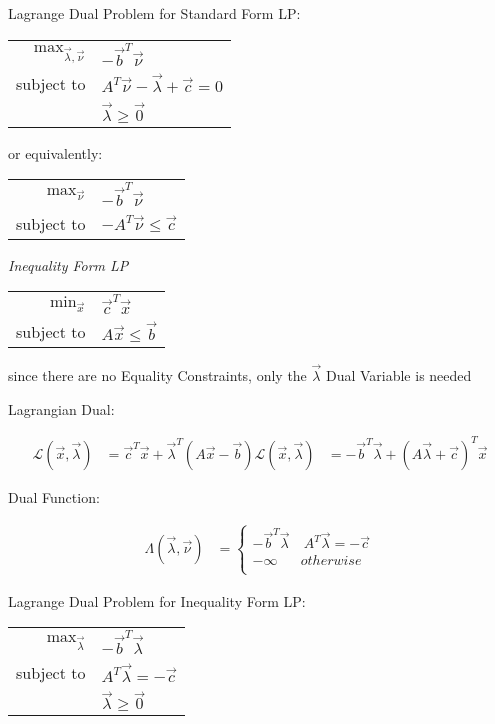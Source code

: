 Lagrange Dual Problem for Standard Form LP:

\begin{tabular}{r l}
  $\mathrm{max}_{\vec{\lambda},\vec{\nu}}$ &
    $-\vec{b}^T\vec{\nu}$ \\
  subject to & $A^T\vec{\nu} - \vec{\lambda} + \vec{c} = 0$ \\
             & $\vec{\lambda} \geq \vec{0}$ \\
\end{tabular}

or equivalently:

\begin{tabular}{r l}
  $\mathrm{max}_{\vec{\nu}}$ &
    $-\vec{b}^T\vec{\nu}$ \\
  subject to & $-A^T\vec{\nu} \leq \vec{c}$ \\
\end{tabular}


\emph{Inequality Form LP}

\begin{tabular}{r l}
  $\mathrm{min}_{\vec{x}}$ & $\vec{c}^T\vec{x}$      \\
  subject to               & $A\vec{x} \leq \vec{b}$ \\
\end{tabular}

since there are no Equality Constraints, only the $\vec{\lambda}$ Dual Variable
is needed

Lagrangian Dual:

\begin{align*}
  \mathcal{L}(\vec{x}, \vec{\lambda}) & =
    \vec{c}^T\vec{x} + \vec{\lambda}^T(A\vec{x} - \vec{b})
  \mathcal{L}(\vec{x}, \vec{\lambda}) & =
    -\vec{b}^T\vec{\lambda} + (A\vec{\lambda} + \vec{c})^T \vec{x}
\end{align*}

Dual Function:

\begin{align*}
  \Lambda(\vec{\lambda},\vec{\nu}) & = \begin{cases}
    -\vec{b}^T\vec{\lambda} & \ A^T\vec{\lambda} = -\vec{c} \\
    -\infty                 & otherwise \\
  \end{cases}
\end{align*}

Lagrange Dual Problem for Inequality Form LP:

\begin{tabular}{r l}
  $\mathrm{max}_{\vec{\lambda}}$ & $-\vec{b}^T\vec{\lambda}$ \\
  subject to & $A^T\vec{\lambda} = -\vec{c}$ \\
             & $\vec{\lambda} \geq \vec{0}$  \\
\end{tabular}


